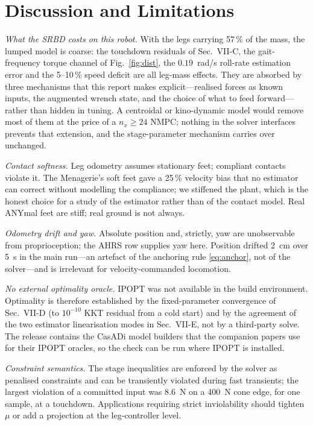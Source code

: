 \documentclass[11pt]{article}
\begin{document}
\section{Discussion and Limitations}
\emph{What the SRBD costs on this robot.} With the legs carrying 57\,\% of the mass, the lumped model is coarse: the touchdown residuals of Sec.~VII-C, the gait-frequency torque channel of Fig.~\ref{fig:dist}, the $0.19$~rad/s roll-rate estimation error and the 5--10\,\% speed deficit are all leg-mass effects. They are absorbed by three mechanisms that this report makes explicit---realised forces as known inputs, the augmented wrench state, and the choice of what to feed forward---rather than hidden in tuning. A centroidal or kino-dynamic model would remove most of them at the price of a $n_x\ge24$ NMPC; nothing in the solver interfaces prevents that extension, and the stage-parameter mechanism carries over unchanged.

\emph{Contact softness.} Leg odometry assumes stationary feet; compliant contacts violate it. The Menagerie's soft feet gave a 25\,\% velocity bias that no estimator can correct without modelling the compliance; we stiffened the plant, which is the honest choice for a study of the estimator rather than of the contact model. Real ANYmal feet are stiff; real ground is not always.

\emph{Odometry drift and yaw.} Absolute position and, strictly, yaw are unobservable from proprioception; the AHRS row supplies yaw here. Position drifted 2~cm over 5~s in the main run---an artefact of the anchoring rule \eqref{eq:anchor}, not of the solver---and is irrelevant for velocity-commanded locomotion.

\emph{No external optimality oracle.} IPOPT was not available in the build environment. Optimality is therefore established by the fixed-parameter convergence of Sec.~VII-D (to $10^{-10}$ KKT residual from a cold start) and by the agreement of the two estimator linearisation modes in Sec.~VII-E, not by a third-party solve. The release contains the CasADi model builders that the companion papers use for their IPOPT oracles, so the check can be run where IPOPT is installed.

\emph{Constraint semantics.} The stage inequalities are enforced by the solver as penalised constraints and can be transiently violated during fast transients; the largest violation of a committed input was 8.6~N on a 400~N cone edge, for one sample, at a touchdown. Applications requiring strict inviolability should tighten $\mu$ or add a projection at the leg-controller level.
\end{document}
